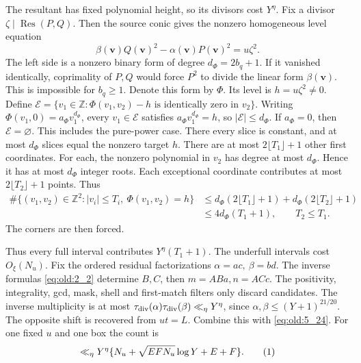 \begin{enumerate}
The resultant has fixed polynomial height, so its divisors cost
\(Y^\eta\). Fix a divisor \(\zeta\mid\operatorname{Res}(P,Q)\). Then the
source conic gives the nonzero homogeneous
level equation
\[
\beta(\mathbf v) Q(\mathbf v)^2-\alpha(\mathbf v) P(\mathbf v)^2=u\zeta^2.
\]
The left side is a nonzero binary form of degree \(d_\Phi=2b_q+1\). If it
vanished identically, coprimality of \(P,Q\) would force \(P^2\) to
divide the linear form \(\beta(\mathbf v)\). This is impossible for \(b_q\ge1\).
Denote this form by \(\Phi\). Its level is \(h=u\zeta^2\ne0\). Define
\(\mathcal E=\{v_1\in\mathbb Z:\Phi(v_1,v_2)-h\text{ is identically zero in }v_2\}\).
Writing \(\Phi(v_1,0)=a_\Phi v_1^{d_\Phi}\), every \(v_1\in\mathcal E\) satisfies
\(a_\Phi v_1^{d_\Phi}=h\), so \(|\mathcal E|\le d_\Phi\). If \(a_\Phi=0\), then \(\mathcal E=\varnothing\).
This includes the pure-power case. There every slice is constant, and at most
\(d_\Phi\) slices equal the nonzero target \(h\). There are at most
\(2\lfloor T_1\rfloor+1\) other first coordinates. For each, the nonzero
polynomial in \(v_2\) has degree at most \(d_\Phi\). Hence it has at most \(d_\Phi\)
integer roots. Each exceptional coordinate contributes at most
\(2\lfloor T_2\rfloor+1\) points. Thus
\[
\begin{aligned}
\#\{(v_1,v_2)\in\mathbb Z^2:|v_i|\le T_i,\ \Phi(v_1,v_2)=h\}
&\le d_\Phi(2\lfloor T_1\rfloor+1)+d_\Phi(2\lfloor T_2\rfloor+1)\\
&\le4d_\Phi(T_1+1),\qquad T_2\le T_1.
\end{aligned}
\]
The corners are then forced.
\end{enumerate}

Thus every full interval contributes \(Y^\eta(T_1+1)\). The underfull
intervals cost \(O_\xi(N_u)\). Fix the ordered residual factorizations
\(\alpha=ac,\ \beta=bd\). The inverse formulas \eqref{eq:old:2_2} determine \(B,C\),
then \(m=ABa,n=ACc\). The positivity, integrality, gcd, mask, shell and
first-match filters only discard candidates. The inverse multiplicity is
at most \(\tau_{\mathrm{div}}(\alpha)\tau_{\mathrm{div}}(\beta)\ll_\eta Y^\eta\), since
\(\alpha,\beta\le(Y+1)^{21/20}\). The opposite shift is recovered from
\(ut=L\).
Combine this with \eqref{eq:old:5_24}. For one fixed \(u\) and one box the count is
\[
 \ll_\eta Y^\eta\{N_u+\sqrt{EFN_u}\log Y+E+F\}.
\AutoTag{eq:old:5_25}
\]


